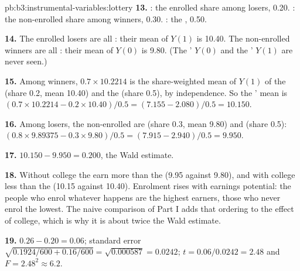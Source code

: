 \begin{solution}{pb:b3:instrumental-variables:lottery}
\textbf{13.} : the enrolled share among losers, 0.20.
: the non-enrolled share among winners, 0.30. : the , 0.50.

\textbf{14.} The enrolled losers are all : their mean of $Y(1)$ is
10.40. The non-enrolled winners are all : their mean of $Y(0)$ is
9.80. (The ' $Y(0)$ and the ' $Y(1)$ are never seen.)

\textbf{15.} Among winners, $0.7 \times 10.2214$ is the share-weighted mean
of $Y(1)$ of the  (share 0.2, mean 10.40) and the 
(share 0.5), by independence. So the ' mean is $(0.7 \times 10.2214 -
0.2 \times 10.40)/0.5 = (7.155 - 2.080)/0.5 = 10.150$.

\textbf{16.} Among losers, the non-enrolled are  (share 0.3, mean
9.80) and  (share 0.5): $(0.8 \times 9.89375 - 0.3 \times 9.80)/0.5
= (7.915 - 2.940)/0.5 = 9.950$.

\textbf{17.} $10.150 - 9.950 = 0.200$, the Wald estimate.

\textbf{18.} Without college the  earn more than the 
(9.95 against 9.80), and with college less than the  (10.15
against 10.40). Enrolment rises with earnings potential: the people who enrol
whatever happens are the highest earners, those who never enrol the lowest.
The naive comparison of Part I adds that ordering to the effect of college,
which is why it is about twice the Wald estimate.

\textbf{19.}  $0.26 - 0.20 = 0.06$; standard error $\sqrt{0.1924/600
+ 0.16/600} = \sqrt{0.000587} = 0.0242$; $t = 0.06/0.0242 = 2.48$ and $F = 2.48^2
\approx 6.2$.


\end{solution}
